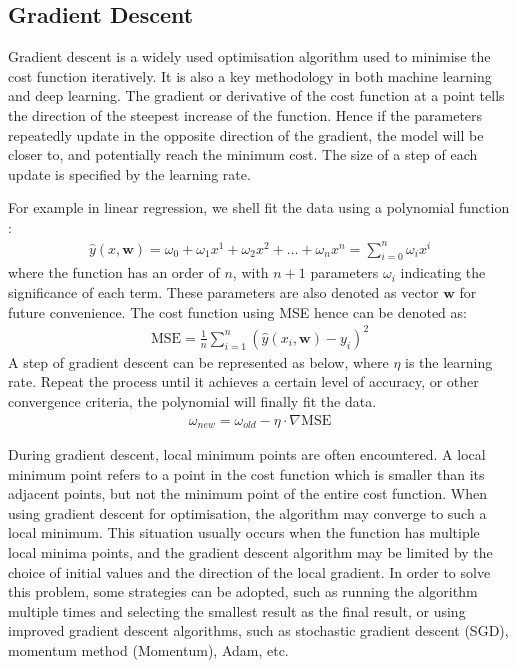 \subsection{Gradient Descent}

Gradient descent is a widely used optimisation algorithm used to minimise the cost function iteratively. It is also a key methodology in both machine learning and deep learning. 
The gradient or derivative of the cost function at a point tells the direction of the steepest increase of the function. 
Hence if the parameters repeatedly update in the opposite direction of the gradient, the model will be closer to, and potentially reach the minimum cost. 
The size of a step of each update is specified by the learning rate. 

For example in linear regression, we shell fit the data using a polynomial function \cite{Bishop}: 
\begin{gather}
    \hat{y}(x, \mathbf{w}) = \omega _0 + \omega _1x^1 + \omega _2x^2 + \dots +\omega _nx^n = \sum_{i=0}^{n}\omega _ix^i 
\end{gather}
where the function has an order of $n$, with $n+1$ parameters $\omega_i$ indicating the significance of each term. These parameters are also denoted as vector $\mathbf{w}$ for future convenience.
The cost function using MSE hence can be denoted as:
\begin{gather}
    \mathrm{MSE} = \frac{1}{n}\sum_{i=1}^{n}(\hat{y}(x_i, \mathbf{w}) - y_i)^2 
\end{gather}
A step of gradient descent can be represented as below, where $\eta$ is the learning rate. 
Repeat the process until it achieves a certain level of accuracy, or other convergence criteria, the polynomial will finally fit the data.
\begin{gather}
    \omega_{new} = \omega_{old} - \eta  \cdot \nabla \mathrm{MSE}
\end{gather}

During gradient descent, local minimum points are often encountered. A local minimum point refers to a point in the cost function which is smaller than its adjacent points, but not the minimum point of the entire cost function.
When using gradient descent for optimisation, the algorithm may converge to such a local minimum. This situation usually occurs when the function has multiple local minima points, and the gradient descent algorithm may be limited by the choice of initial values and the direction of the local gradient. 
In order to solve this problem, some strategies can be adopted, such as running the algorithm multiple times and selecting the smallest result as the final result, or using improved gradient descent algorithms, such as stochastic gradient descent (SGD), momentum method (Momentum), Adam, etc.

